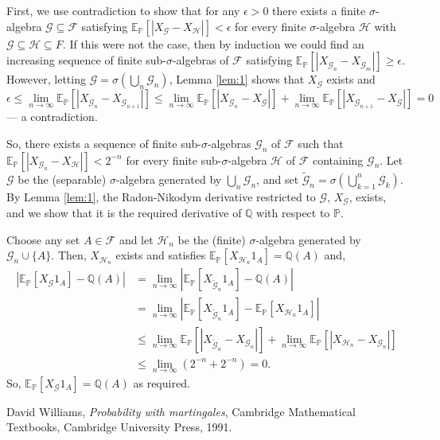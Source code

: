 \documentclass[12pt]{article}
\begin{document}
First, we use contradiction to show that for any $\epsilon>0$ there exists a finite $\sigma$-algebra $\mathcal{G}\subseteq\mathcal{F}$ satisfying $\mathbb{E}_\mathbb{P}[|X_\mathcal{G}-X_\mathcal{H}|]<\epsilon$ for every finite $\sigma$-algebra $\mathcal{H}$ with $\mathcal{G}\subseteq\mathcal{H}\subseteq{F}$. If this were not the case, then by induction we could find an increasing sequence of finite sub-$\sigma$-algebras of $\mathcal{F}$ satisfying $\mathbb{E}_\mathbb{P}[|X_{\mathcal{G}_n}-X_{\mathcal{G}_m}|]\ge\epsilon$.
However, letting $\mathcal{G}=\sigma(\bigcup_n\mathcal{G}_n)$, Lemma \ref{lem:1} shows that $X_\mathcal{G}$ exists and
\begin{equation*}
\epsilon\le\lim_{n\rightarrow\infty}\mathbb{E}_\mathbb{P}[|X_{\mathcal{G}_n}-X_{\mathcal{G}_{n+1}}|]
\le\lim_{n\rightarrow\infty}\mathbb{E}_\mathbb{P}[|X_{\mathcal{G}_n}-X_{\mathcal{G}}|]+\lim_{n\rightarrow\infty}\mathbb{E}_\mathbb{P}[|X_{\mathcal{G}_{n+1}}-X_{\mathcal{G}}|]=0
\end{equation*}
--- a contradiction.

So, there exists a sequence of finite sub-$\sigma$-algebras $\mathcal{G}_n$ of $\mathcal{F}$ such that $\mathbb{E}_\mathbb{P}[|X_{\mathcal{G}_n}-X_\mathcal{H}|]<2^{-n}$ for every finite sub-$\sigma$-algebra $\mathcal{H}$ of $\mathcal{F}$ containing $\mathcal{G}_n$. Let $\mathcal{G}$ be the (separable) $\sigma$-algebra generated by $\bigcup_n\mathcal{G}_n$, and set $\mathcal{\tilde G}_n=\sigma(\bigcup_{k=1}^n\mathcal{G}_k)$.
By Lemma \ref{lem:1}, the Radon-Nikodym derivative restricted to $\mathcal{G}$, $X_\mathcal{G}$, exists, and we show that it is the required derivative of $\mathbb{Q}$ with respect to $\mathbb{P}$.

Choose any set $A\in\mathcal{F}$ and let $\mathcal{H}_n$ be the (finite) $\sigma$-algebra generated by $\mathcal{G}_n\cup\{A\}$. Then, $X_{\mathcal{H}_n}$ exists and satisfies $\mathbb{E}_{\mathbb{P}}[X_{\mathcal{H}_n}1_A]=\mathbb{Q}(A)$ and,
\begin{equation*}\begin{split}
\left|\mathbb{E}_\mathbb{P}[X_\mathcal{G}1_A]-\mathbb{Q}(A)\right|
&=\lim_{n\rightarrow\infty}\left|\mathbb{E}_\mathbb{P}[X_{\mathcal{\tilde G}_n}1_A]-\mathbb{Q}(A)\right|\\
&=\lim_{n\rightarrow\infty}\left|\mathbb{E}_\mathbb{P}[X_{\mathcal{\tilde G}_n}1_A]-\mathbb{E}_\mathbb{P}[X_{\mathcal{H}_n}1_A]\right|\\
&\le\lim_{n\rightarrow\infty}\mathbb{E}_\mathbb{P}[|X_{\mathcal{\tilde G}_n}-X_{\mathcal{G}_n}|]+\lim_{n\rightarrow\infty}\mathbb{E}_\mathbb{P}[|X_{\mathcal{H}_n}-X_{\mathcal{G}_n}|]\\
&\le\lim_{n\rightarrow\infty}(2^{-n}+2^{-n})=0.
\end{split}\end{equation*}
So, $\mathbb{E}_{\mathbb{P}}[X_\mathcal{G}1_A]=\mathbb{Q}(A)$ as required.


\begin{thebibliography}{9}
David Williams, \emph{Probability with martingales},
Cambridge Mathematical Textbooks, Cambridge University Press, 1991.
\end{thebibliography}

\end{document}
